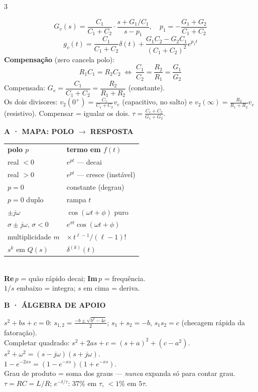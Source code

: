 \documentclass[10pt,a4paper]{article}
\renewcommand{\arraystretch}{1.05}
\newcommand{\sect}[1]{\vspace{1.2mm}{\color{acc}\rule{\linewidth}{0.9pt}}\vspace{-0.3mm}\par
  {\footnotesize\bfseries\color{acc}\MakeUppercase{#1}}\par\vspace{0.6mm}}
\newcommand{\sub}[1]{\vspace{0.8mm}{\bfseries #1}\par\vspace{0.3mm}}
\newcommand{\cip}{0^{+}}
\begin{document}
\begin{multicols}{3}
\sub{Ponta de prova ($R_1\|C_1$ + $R_2\|C_2$)}
\[G_v(s)=\frac{C_1}{C_1{+}C_2}\cdot\frac{s+G_1/C_1}{s-p_1},\quad p_1=-\frac{G_1{+}G_2}{C_1{+}C_2}\]
\[g_v(t)=\frac{C_1}{C_1{+}C_2}\delta(t)+\frac{G_1C_2{-}G_2C_1}{(C_1{+}C_2)^2}e^{p_1t}\]
\textbf{Compensação} (zero cancela polo):
\[\boxed{\;R_1C_1=R_2C_2\;\Longleftrightarrow\;\frac{C_1}{C_2}=\frac{R_2}{R_1}=\frac{G_1}{G_2}\;}\]
Compensada: $G_v=\dfrac{C_1}{C_1+C_2}=\dfrac{R_2}{R_1+R_2}$ (constante).\\[0.4mm]
Os dois divisores: $v_2(\cip)=\frac{C_1}{C_1+C_2}v_e$ (capacitivo, no salto) e $v_2(\infty)=\frac{R_2}{R_1+R_2}v_e$ (resistivo). Compensar = igualar os dois. $\tau=\frac{C_1+C_2}{G_1+G_2}$.


\sect{A · Mapa: polo $\to$ resposta}
{\renewcommand{\arraystretch}{1.25}
\begin{tabular}{@{}l@{\;\;}l@{}}
\textbf{polo $p$} & \textbf{termo em $f(t)$}\\
real $<0$ & $e^{pt}$ — decai\\
real $>0$ & $e^{pt}$ — cresce (instável)\\
$p=0$ & constante (degrau)\\
$p=0$ duplo & rampa $t$\\
$\pm j\omega$ & $\cos(\omega t+\phi)$ puro\\
$\sigma\pm j\omega$, $\sigma<0$ & $e^{\sigma t}\cos(\omega t+\phi)$\\
multiplicidade $m$ & $\times\,t^{\ell-1}/(\ell-1)!$\\
$s^k$ em $Q(s)$ & $\delta^{(k)}(t)$\\
\end{tabular}}\\[1mm]
\textbf{Re}\,$p$ = quão rápido decai;\; \textbf{Im}\,$p$ = frequência.\\
$1/s$ embaixo = integra; $s$ em cima = deriva.

\sect{B · Álgebra de apoio}
$s^2+bs+c=0$:\; $s_{1,2}=\frac{-b\pm\sqrt{b^2-4c}}{2}$;\; $s_1{+}s_2=-b$, $s_1s_2=c$ (checagem rápida da fatoração).\\[0.6mm]
Completar quadrado: $s^2{+}2as{+}c=(s{+}a)^2+(c{-}a^2)$.\\[0.6mm]
$s^2+\omega^2=(s-j\omega)(s+j\omega)$.\\[0.6mm]
$1-e^{-2xs}=(1-e^{-xs})(1+e^{-xs})$.\\[0.6mm]
Grau de produto = soma dos graus — \emph{nunca} expanda só para contar grau.\\[0.6mm]
$\tau=RC=L/R$;\; $e^{-t/\tau}$: 37\% em $\tau$, $<1$\% em $5\tau$.


\end{multicols}
\end{document}
